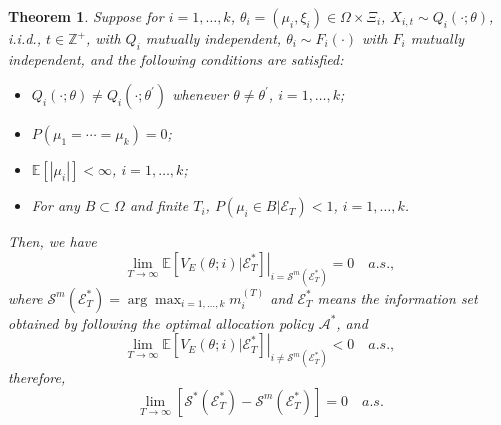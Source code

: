 \documentclass[journal]{IEEEtran}
\newtheorem{theorem}{Theorem}
\begin{document}
 
     \begin{theorem} \label{thm2} Suppose for $i=1,\ldots,k$,  $\theta_i=(\mu_i,\xi_i)\in\Omega\times \Xi_i$,   $X_{i,t}\sim Q_i(\cdot;\theta)$,
     i.i.d., $t\in \mathbb{Z}^{+}$, with $Q_i$ mutually independent, $\theta_i\sim F_i(\cdot)$ with $F_i$ mutually independent, and the following conditions are satisfied:
      \begin{itemize}
      \item[(i)]$Q_i(\cdot;\theta)\neq Q_i(\cdot;\theta^{'})$ whenever $\theta\neq\theta^{'}$, $i=1,\ldots,k$;
     \item[(ii)]$P\left( \mu_1=\cdots=\mu_k\right)=0$;
     \item[(iii)] $\mathbb{E}\left[|\mu_i|\right]<\infty$, $i=1,\ldots,k$;
     \item[(iv)]For any $B\subset \Omega$ and finite $T_i$, $P(\mu_i\in B|\mathcal{E}_T)<1$, $i=1,\ldots,k$.
    \end{itemize}
     Then,  we have
     \begin{equation*}\lim_{T\to\infty}\left.\mathbb{E}\left[ V_{E}(\theta;i)|\mathcal{E}_T^{*}\right]\right|_{i=\mathcal{S}^m(\mathcal{E}_T^{*})}=0\quad a.s.,\end{equation*}
      where $\mathcal{S}^m(\mathcal{E}_T^{*})=\arg\max_{i=1,\ldots,k}m_i^{(T)}$ and $\mathcal{E}_T^{*}$ means the information set obtained by following the optimal allocation policy $\mathcal{A}^{*}$, and
     \begin{equation*}
    \lim_{T\to\infty}\left.\mathbb{E}\left[ V_{E}(\theta;i)|\mathcal{E}_T^{*}\right]\right|_{i\neq \mathcal{S}^m(\mathcal{E}_T^{*})}<0\quad a.s.,\end{equation*}
    therefore, $$\lim_{T\to\infty}\left[\mathcal{S}^{*}(\mathcal{E}_T^{*})-\mathcal{S}^{m}(\mathcal{E}_T^{*})\right]=0\quad  a.s.$$ 
     \end{theorem}
\end{document}
